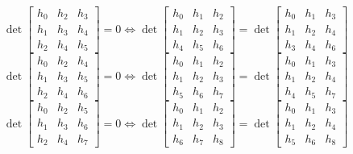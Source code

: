 $$ \det \left[\begin{matrix}{h}_{0} & {h}_{2} & {h}_{3}\\{h}_{1} & {h}_{3} & {h}_{4}\\{h}_{2} & {h}_{4} & {h}_{5}\end{matrix}\right] = 0 \Leftrightarrow \det \left[\begin{matrix}{h}_{0} & {h}_{1} & {h}_{2}\\{h}_{1} & {h}_{2} & {h}_{3}\\{h}_{4} & {h}_{5} & {h}_{6}\end{matrix}\right] = \det \left[\begin{matrix}{h}_{0} & {h}_{1} & {h}_{3}\\{h}_{1} & {h}_{2} & {h}_{4}\\{h}_{3} & {h}_{4} & {h}_{6}\end{matrix}\right] $$
$$ \det \left[\begin{matrix}{h}_{0} & {h}_{2} & {h}_{4}\\{h}_{1} & {h}_{3} & {h}_{5}\\{h}_{2} & {h}_{4} & {h}_{6}\end{matrix}\right] = 0 \Leftrightarrow \det \left[\begin{matrix}{h}_{0} & {h}_{1} & {h}_{2}\\{h}_{1} & {h}_{2} & {h}_{3}\\{h}_{5} & {h}_{6} & {h}_{7}\end{matrix}\right] = \det \left[\begin{matrix}{h}_{0} & {h}_{1} & {h}_{3}\\{h}_{1} & {h}_{2} & {h}_{4}\\{h}_{4} & {h}_{5} & {h}_{7}\end{matrix}\right] $$
$$ \det \left[\begin{matrix}{h}_{0} & {h}_{2} & {h}_{5}\\{h}_{1} & {h}_{3} & {h}_{6}\\{h}_{2} & {h}_{4} & {h}_{7}\end{matrix}\right] = 0 \Leftrightarrow \det \left[\begin{matrix}{h}_{0} & {h}_{1} & {h}_{2}\\{h}_{1} & {h}_{2} & {h}_{3}\\{h}_{6} & {h}_{7} & {h}_{8}\end{matrix}\right] = \det \left[\begin{matrix}{h}_{0} & {h}_{1} & {h}_{3}\\{h}_{1} & {h}_{2} & {h}_{4}\\{h}_{5} & {h}_{6} & {h}_{8}\end{matrix}\right] $$
